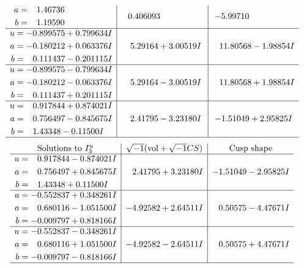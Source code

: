 \documentclass[1p]{elsarticle_modified}
\theoremstyle{definition}
\newcommand{\I}{\sqrt{-1}}
\begin{document}
$$\begin{array}{c|c|c}
\begin{aligned}
a &= \phantom{-}1.46736\phantom{ +0.000000I} \\
b &= \phantom{-}1.19590\phantom{ +0.000000I}\end{aligned}
 & \phantom{-}0.406093\phantom{ +0.000000I} & -5.99710\phantom{ +0.000000I} \\ \hline\begin{aligned}
u &= -0.899575 + 0.799634 I \\
a &= -0.180212 + 0.063376 I \\
b &= \phantom{-}0.111437 - 0.201115 I\end{aligned}
 & \phantom{-}5.29164 + 3.00519 I & \phantom{-}11.80568 - 1.98854 I \\ \hline\begin{aligned}
u &= -0.899575 - 0.799634 I \\
a &= -0.180212 - 0.063376 I \\
b &= \phantom{-}0.111437 + 0.201115 I\end{aligned}
 & \phantom{-}5.29164 - 3.00519 I & \phantom{-}11.80568 + 1.98854 I \\ \hline\begin{aligned}
u &= \phantom{-}0.917844 + 0.874021 I \\
a &= \phantom{-}0.756497 - 0.845675 I \\
b &= \phantom{-}1.43348 - 0.11500 I\end{aligned}
 & \phantom{-}2.41795 - 3.23180 I & -1.51049 + 2.95825 I\\
 \hline 
 \end{array}$$\newpage$$\begin{array}{c|c|c}  
\text{Solutions to }I^u_{3}& \I (\text{vol} + \sqrt{-1}CS) & \text{Cusp shape}\\
 \hline 
\begin{aligned}
u &= \phantom{-}0.917844 - 0.874021 I \\
a &= \phantom{-}0.756497 + 0.845675 I \\
b &= \phantom{-}1.43348 + 0.11500 I\end{aligned}
 & \phantom{-}2.41795 + 3.23180 I & -1.51049 - 2.95825 I \\ \hline\begin{aligned}
u &= -0.552837 + 0.348261 I \\
a &= \phantom{-}0.680116 - 1.051500 I \\
b &= -0.009797 + 0.818166 I\end{aligned}
 & -4.92582 + 2.64511 I & \phantom{-}0.50575 - 4.47671 I \\ \hline\begin{aligned}
u &= -0.552837 - 0.348261 I \\
a &= \phantom{-}0.680116 + 1.051500 I \\
b &= -0.009797 - 0.818166 I\end{aligned}
 & -4.92582 - 2.64511 I & \phantom{-}0.50575 + 4.47671 I\\
 \hline 
 \end{array}$$\newpage
\end{document}
